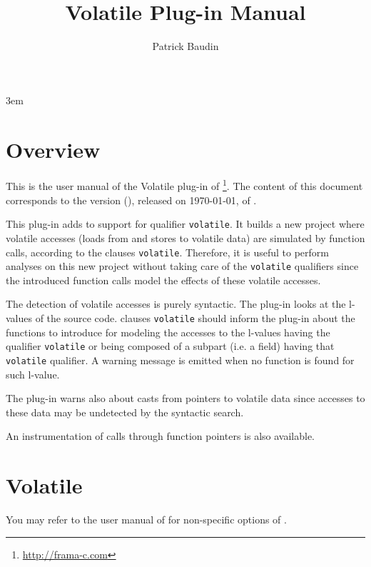 \documentclass{frama-c-book}
\title{Volatile Plug-in Manual}
\author{Patrick Baudin}
\newcommand{\FCVERSION}{(\unskip)}
\begin{document}
\sloppy
\emergencystretch 3em

\maketitle
\tableofcontents



\chapter{Overview}

This is the user manual of the Volatile plug-in of \FramaC\footnote{\url{http://frama-c.com}}.
The content of this document corresponds to the version \FCVERSION, released on \today, of
\FramaC.

This plug-in adds to \FramaC support for \C qualifier {\tt volatile}.
It builds a new project where volatile accesses (loads from and stores to volatile data) are simulated by function calls, according to the \acsl\cite{acsl-implem} clauses {\tt volatile}.
Therefore, it is useful to perform analyses on this new project without taking care of the {\tt volatile} qualifiers since the introduced function calls model the effects of these volatile accesses.

The detection of volatile accesses is purely syntactic.
The plug-in looks at the l-values of the source code.
\acsl\cite{acsl-implem} clauses {\tt volatile} should inform the plug-in about the functions to introduce for modeling the accesses to the l-values having the qualifier {\tt volatile} or being composed of a subpart (i.e. a field) having that {\tt volatile} qualifier.
A warning message is emitted when no function is found for such l-value.

The plug-in warns also about casts from pointers to volatile data since accesses to these data may be undetected by the syntactic search.

An instrumentation of calls through function pointers is also available.


\chapter{Volatile}

You may refer to the user manual of \FramaC \cite{userman} for non-specific
options of \FramaC.
\end{document}
